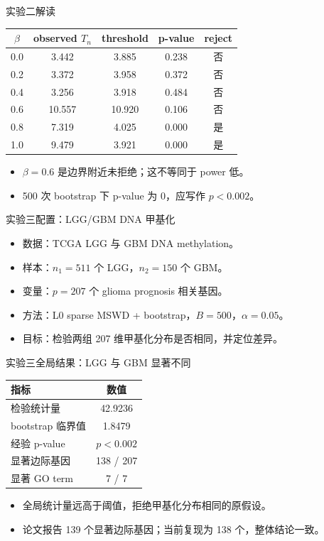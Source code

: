 \documentclass[UTF8,aspectratio=169,11pt]{ctexbeamer}
\begin{document}
\begin{frame}{实验二解读}
\small
\begin{tabular}{ccccc}
\toprule
\(\beta\) & observed \(T_n\) & threshold & p-value & reject \\
\midrule
0.0 & 3.442 & 3.885 & 0.238 & 否 \\
0.2 & 3.372 & 3.958 & 0.372 & 否 \\
0.4 & 3.256 & 3.918 & 0.484 & 否 \\
0.6 & 10.557 & 10.920 & 0.106 & 否 \\
0.8 & 7.319 & 4.025 & 0.000 & 是 \\
1.0 & 9.479 & 3.921 & 0.000 & 是 \\
\bottomrule
\end{tabular}

\vspace{0.25cm}
\begin{itemize}
  \item \(\beta=0.6\) 是边界附近未拒绝；这不等同于 power 低。
  \item 500 次 bootstrap 下 p-value 为 0，应写作 \(p<0.002\)。
\end{itemize}
\end{frame}

\begin{frame}{实验三配置：LGG/GBM DNA 甲基化}
\begin{itemize}
  \item 数据：TCGA LGG 与 GBM DNA methylation。
  \item 样本：\(n_1=511\) 个 LGG，\(n_2=150\) 个 GBM。
  \item 变量：\(p=207\) 个 glioma prognosis 相关基因。
  \item 方法：L0 sparse MSWD + bootstrap，\(B=500\)，\(\alpha=0.05\)。
  \item 目标：检验两组 207 维甲基化分布是否相同，并定位差异。
\end{itemize}
\end{frame}

\begin{frame}{实验三全局结果：LGG 与 GBM 显著不同}
\begin{tabular}{lc}
\toprule
指标 & 数值 \\
\midrule
检验统计量 & 42.9236 \\
bootstrap 临界值 & 1.8479 \\
经验 p-value & \(p<0.002\) \\
显著边际基因 & 138 / 207 \\
显著 GO term & 7 / 7 \\
\bottomrule
\end{tabular}

\vspace{0.5cm}
\begin{itemize}
  \item 全局统计量远高于阈值，拒绝甲基化分布相同的原假设。
  \item 论文报告 139 个显著边际基因；当前复现为 138 个，整体结论一致。
\end{itemize}
\end{frame}
\end{document}
